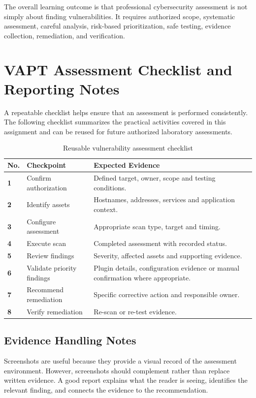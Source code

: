 \documentclass[11pt,a4paper]{article}
\begin{document}
The overall learning outcome is that professional cybersecurity assessment is not simply about finding vulnerabilities. It requires authorized scope, systematic assessment, careful analysis, risk-based prioritization, safe testing, evidence collection, remediation, and verification.



\newpage
\section{VAPT Assessment Checklist and Reporting Notes}
A repeatable checklist helps ensure that an assessment is performed consistently. The following checklist summarizes the practical activities covered in this assignment and can be reused for future authorized laboratory assessments.

\begin{table}[H]\centering
\small
\begin{tabularx}{\textwidth}{>{\bfseries}p{0.8cm}p{4.2cm}X}
\toprule
No. & Checkpoint & Expected Evidence\\
\midrule
1 & Confirm authorization & Defined target, owner, scope and testing conditions.\\
2 & Identify assets & Hostnames, addresses, services and application context.\\
3 & Configure assessment & Appropriate scan type, target and timing.\\
4 & Execute scan & Completed assessment with recorded status.\\
5 & Review findings & Severity, affected assets and supporting evidence.\\
6 & Validate priority findings & Plugin details, configuration evidence or manual confirmation where appropriate.\\
7 & Recommend remediation & Specific corrective action and responsible owner.\\
8 & Verify remediation & Re-scan or re-test evidence.\\
\bottomrule
\end{tabularx}
\caption{Reusable vulnerability assessment checklist}
\end{table}

\subsection{Evidence Handling Notes}
Screenshots are useful because they provide a visual record of the assessment environment. However, screenshots should complement rather than replace written evidence. A good report explains what the reader is seeing, identifies the relevant finding, and connects the evidence to the recommendation.
\end{document}
